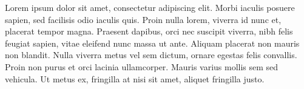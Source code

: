 
Lorem ipsum dolor sit amet, consectetur adipiscing elit. Morbi iaculis posuere sapien, sed facilisis odio iaculis quis. 
Proin nulla lorem, viverra id nunc et, placerat tempor magna. Praesent dapibus, orci nec suscipit viverra, nibh felis feugiat sapien, 
vitae eleifend nunc massa ut ante. Aliquam placerat non mauris non blandit. Nulla viverra metus vel sem dictum, ornare egestas felis convallis. 
Proin non purus et orci lacinia ullamcorper. Mauris varius mollis sem sed vehicula. Ut metus ex, fringilla at nisi sit amet, aliquet fringilla justo.


